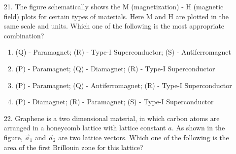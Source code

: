 \documentclass[journal]{IEEEtran}
\begin{document}
\begin{enumerate}
    \item[21.] The figure schematically shows the M (magnetization) - H (magnetic field) plots
    for certain types of materials. Here M and H are plotted in the same scale and
    units. Which one of the following is the most appropriate combination? 
    \begin{figure}[!ht]
        \centering
        \caption{}
    \end{figure}
    \begin{enumerate}[label = (\Alph*)]
        \item (Q) - Paramagnet; (R) - Type-I Superconductor; (S) - Antiferromagnet
        \item (P) - Paramagnet; (Q) - Diamagnet; (R) - Type-I Superconductor
        \item (P) - Paramagnet; (Q) - Antiferromagnet; (R) - Type-I Superconductor
        \item (P) - Diamagnet; (R) - Paramagnet; (S) - Type-I Superconductor
    \end{enumerate}
    \item[22.] Graphene is a two dimensional material, in which carbon atoms are arranged in a
    honeycomb lattice with lattice constant $a$. As shown in the figure, $\overrightarrow{a}_1$ and $\overrightarrow{a}_2$
    are two lattice vectors. Which one of the following is the area of the first Brillouin
    zone for this lattice? 
    \begin{figure}[!ht]
        \centering
\end{figure}
\end{enumerate}
\end{document}
